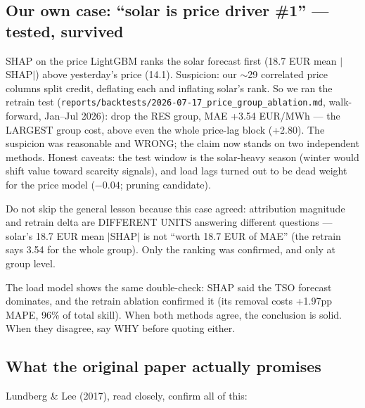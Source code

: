 \subsection{Our own case: ``solar is price driver \#1'' --- tested, survived}

SHAP on the price LightGBM ranks the solar forecast first
(18.7 EUR mean $|$SHAP$|$) above yesterday's price (14.1). Suspicion:
our $\sim$29 correlated price columns split credit, deflating each and
inflating solar's rank. So we ran the retrain test
(\texttt{reports/backtests/2026-07-17\_price\_group\_ablation.md},
walk-forward, Jan--Jul 2026): drop the RES group, MAE +3.54 EUR/MWh ---
the LARGEST group cost, above even the whole price-lag block (+2.80).
The suspicion was reasonable and WRONG; the claim now stands on two
independent methods. Honest caveats: the test window is the
solar-heavy season (winter would shift value toward scarcity signals),
and load lags turned out to be dead weight for the price model
($-0.04$; pruning candidate).

Do not skip the general lesson because this case agreed: attribution
magnitude and retrain delta are DIFFERENT UNITS answering different
questions --- solar's 18.7 EUR mean $|$SHAP$|$ is not ``worth 18.7 EUR
of MAE'' (the retrain says 3.54 for the whole group). Only the ranking
was confirmed, and only at group level.

The load model shows the same double-check: SHAP said the TSO forecast
dominates, and the retrain ablation confirmed it (its removal costs
+1.97pp MAPE, 96\% of total skill). When both methods agree, the
conclusion is solid. When they disagree, say WHY before quoting either.

\subsection{What the original paper actually promises}

Lundberg \& Lee (2017), read closely, confirm all of this:


